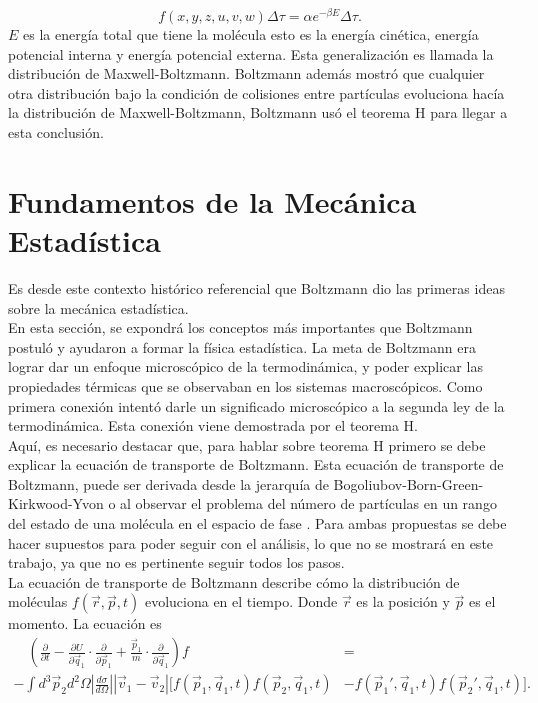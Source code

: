\begin{equation}
f(x,y,z,u,v,w) \Delta \tau = \alpha e^{-\beta E} \Delta \tau.
\end{equation}
$E$ es la energía total que tiene la molécula esto es la energía cinética, energía potencial interna y energía potencial externa. Esta generalización es llamada la distribución de Maxwell-Boltzmann. Boltzmann además mostró que cualquier otra distribución bajo la condición de colisiones entre partículas evoluciona hacía la distribución de Maxwell-Boltzmann, Boltzmann usó el teorema H para llegar a esta conclusión.
\section{Fundamentos de la Mecánica Estadística}
Es desde este contexto histórico referencial que Boltzmann dio las primeras ideas sobre la mecánica estadística.
\\
En esta sección, se expondrá los conceptos más importantes que Boltzmann postuló y ayudaron a formar la física estadística. La meta de Boltzmann era lograr dar un enfoque microscópico de la termodinámica, y poder explicar las propiedades térmicas que se observaban en los sistemas macroscópicos. Como primera conexión intentó darle un significado microscópico a la segunda ley de la termodinámica. Esta conexión viene demostrada por el teorema H.
\\
Aquí, es necesario destacar que, para hablar sobre teorema H primero se debe explicar la ecuación de transporte de Boltzmann. Esta ecuación de transporte de Boltzmann, puede ser derivada desde la jerarquía de Bogoliubov-Born-Green-Kirkwood-Yvon o al observar el problema del número de partículas en un rango del estado de una molécula en el espacio de fase \cite{HuangStat}. Para ambas propuestas se debe hacer supuestos para poder seguir con el análisis, lo que  no se mostrará en este trabajo, ya que  no es pertinente seguir todos los pasos. 
\\
La ecuación de transporte de Boltzmann describe cómo la distribución de moléculas $f(\vec{r},\vec{p},t)$ evoluciona en el tiempo. Donde $\vec{r}$ es la posición y $\vec{p}$ es el momento. La ecuación es       	
\begin{align*}
\quad (\frac{\partial}{\partial t}- \frac{\partial U}{\partial \vec{q}_{1}} \cdot \frac{\partial}{\partial \vec{p}_{1}} +\frac{\vec{p}_{1}}{m} \cdot \frac{\partial}{\partial \vec{q}_{1}})f  &=
\\
- \int d^{3}\vec{p}_{2}d^{2} \Omega |\frac{d \sigma}{d \Omega}| |\vec{v}_{1}-\vec{v}_{2}|[f(\vec{p}_{1},\vec{q}_{1},t)f(\vec{p}_{2},\vec{q}_{1},t) &- f(\vec{p}_{1}',\vec{q}_{1},t)f(\vec{p}_{2}',\vec{q}_{1},t)].
\end{align*}
